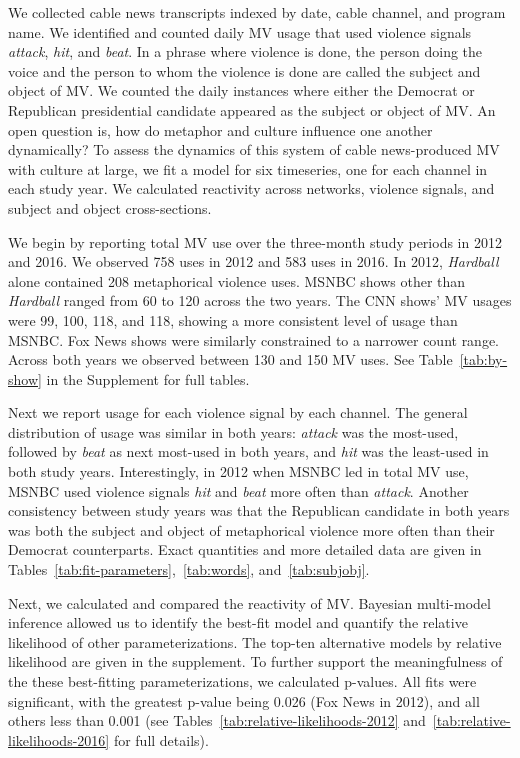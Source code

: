 We collected cable news transcripts indexed by date, cable channel,
and program name. We identified and counted daily MV usage that used
violence signals \emph{attack}, \emph{hit}, and \emph{beat}.
In a phrase where violence is done, the person doing the voice and the person
to whom the violence is done are called the subject and object of MV. 
We counted the daily instances where either the Democrat or Republican 
presidential candidate appeared as the subject or object of MV. An open 
question is, how do metaphor and culture influence one another dynamically?
To assess the dynamics of this system of cable news-produced MV with 
culture at large, we fit a model for six timeseries, one for each 
channel in each study year.  We calculated reactivity across networks, 
violence signals, and subject and object cross-sections.

We begin by reporting total MV use over the three-month study periods 
in 2012 and 2016. We observed 758 uses in 2012 and 583 uses in 2016. 
In 2012, \emph{Hardball} alone contained 208 metaphorical violence uses.
MSNBC shows other than \emph{Hardball} ranged from 60 to 120 across the two years. 
The CNN shows' MV usages were 99, 100, 118, and 118, showing a more consistent
level of usage than MSNBC.  Fox News shows were similarly constrained to a 
narrower count range.  Across both years we observed between 130 and 150 MV uses. 
See Table~\ref{tab:by-show} in the Supplement for full tables.

Next we report usage for each violence signal by each channel. 
The general distribution of usage was similar in both years:
\emph{attack} was the most-used, followed by \emph{beat} as next most-used in
both years, and \emph{hit} was the least-used in both study years. Interestingly,
in 2012 when MSNBC led in total MV use, MSNBC used 
violence signals \emph{hit} and \emph{beat} more often than
\emph{attack}. Another consistency between study years was that the Republican 
candidate in both years was both the subject and object of 
metaphorical violence more often than their Democrat counterparts. Exact
quantities and more detailed data are given in Tables~\ref{tab:fit-parameters},~\ref{tab:words}, 
and~\ref{tab:subjobj}.

Next, we calculated and compared the reactivity of MV. 
Bayesian multi-model inference allowed us to identify the best-fit model and
quantify the relative likelihood of other parameterizations. 
The top-ten alternative models by relative
likelihood are given in the supplement. To further support 
the meaningfulness of the these best-fitting parameterizations, 
we calculated p-values. All fits were
significant, with the greatest p-value being 0.026 (Fox News in 2012), 
and all others less than 0.001 (see Tables~\ref{tab:relative-likelihoods-2012} 
and~\ref{tab:relative-likelihoods-2016} for full details).

